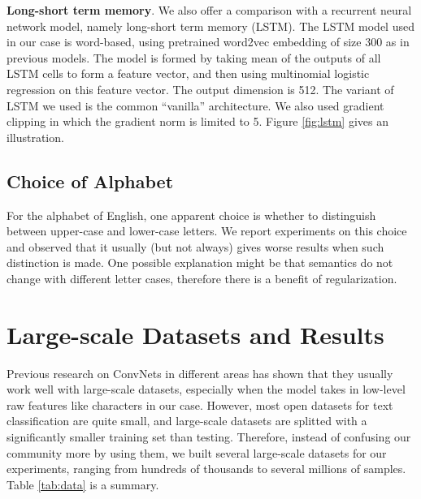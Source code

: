 \documentclass{article} %
\begin{document}
\textbf{Long-short term memory}. We also offer a comparison with a recurrent neural network model, namely long-short term memory (LSTM)\cite{HS97}. The LSTM model used in our case is word-based, using pretrained word2vec embedding of size 300 as in previous models. The model is formed by taking mean of the outputs of all LSTM cells to form a feature vector, and then using multinomial logistic regression on this feature vector. The output dimension is 512. The variant of LSTM we used is the common ``vanilla'' architecture\cite{GS05}\cite{GSKSS15}. We also used gradient clipping\cite{PMB13} in which the gradient norm is limited to 5. Figure \ref{fig:lstm} gives an illustration.

\subsection{Choice of Alphabet}

For the alphabet of English, one apparent choice is whether to distinguish between upper-case and lower-case letters. We report experiments on this choice and observed that it usually (but not always) gives worse results when such distinction is made. One possible explanation might be that semantics do not change with different letter cases, therefore there is a benefit of regularization.

\section{Large-scale Datasets and Results}

Previous research on ConvNets in different areas has shown that they usually work well with large-scale datasets, especially when the model takes in low-level raw features like characters in our case. However, most open datasets for text classification are quite small, and large-scale datasets are splitted with a significantly smaller training set than testing\cite{LYRL04}. Therefore, instead of confusing our community more by using them, we built several large-scale datasets for our experiments, ranging from hundreds of thousands to several millions of samples. Table \ref{tab:data} is a summary.
\end{document}
